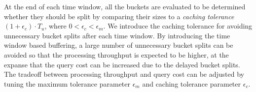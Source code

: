 At the end of each time window, all the buckets are evaluated to be determined whether they should be split by comparing their sizes to a \emph{caching tolerance} $(1+\epsilon_c)\cdot T_u$, where $0<\epsilon_c<\epsilon_m$. We introduce the caching tolerance for avoiding unnecessary bucket splits after each time window. By introducing the time window based buffering, a large number of unnecessary bucket splits can be avoided so that the processing throughput is expected to be higher, at the expanse that the query cost can be increased due to the delayed bucket splits. The tradeoff between processing throughput and query cost can be adjusted by tuning the maximum tolerance parameter $\epsilon_m$ and caching tolerance parameter $\epsilon_c$.



